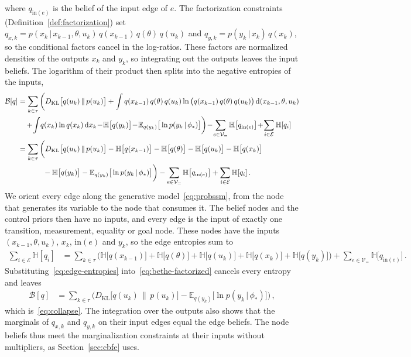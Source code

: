 \documentclass{l4dc2027}
\def\rmd{\mathrm{d}}
\newcommand\given[1][]{\,#1\vert\,}
\newcommand{\E}{\mathbb{E}}
\newcommand{\KL}{D_{\mathrm{KL}}}
\newenvironment{proofof}[1]{\par\noindent{\bfseries\upshape Proof of #1\ }}{\jmlrQED}
\begin{document}
\begin{proofof}{Lemma~\ref{lem:collapse}}
where $q_{\mathrm{in}(e)}$ is the belief of the input edge of $e$. The factorization constraints (Definition~\ref{def:factorization}) set $q_{x,k} = p(x_k \given x_{k-1}, \theta, u_k)\, q(x_{k-1})\, q(\theta)\, q(u_k)$ and $q_{y,k} = p(y_k \given x_k)\, q(x_k)$, so the conditional factors cancel in the log-ratios. These factors are normalized densities of the outputs $x_k$ and $y_k$, so integrating out the outputs leaves the input beliefs. The logarithm of their product then splits into the negative entropies of the inputs,
\begin{align}
	\mathcal{B}[q] &= \sum_{k\in\tau} \bigg( \KL\big[q(u_k) \,\|\, p(u_k)\big]  + \int q(x_{k-1})\, q(\theta)\, q(u_k) \ln\big(q(x_{k-1})\, q(\theta)\, q(u_k)\big)\,\rmd(x_{k-1}, \theta, u_k) \nonumber\\
	&\quad + \! \int \! q(x_k) \ln q(x_k)\,\rmd x_k \! - \! \mathbb{H}\big[q(y_k)\big] \! - \! \E_{q(y_k)}\big[\ln p(y_k \given \phi_*)\big] \bigg)  \! - \! \sum_{e\in\mathcal{V}_=} \mathbb{H}\big[q_{\mathrm{in}(e)}\big] \! + \! \sum_{i\in\mathcal{E}} \mathbb{H}[q_i] \nonumber\\
	&= \sum_{k\in\tau} \bigg( \KL\big[q(u_k) \,\|\, p(u_k)\big] - \mathbb{H}\big[q(x_{k-1})\big] - \mathbb{H}\big[q(\theta)\big] - \mathbb{H}\big[q(u_k)\big] - \mathbb{H}\big[q(x_k)\big] \nonumber\\
	&\hphantom{= \sum_{k\in\tau} \bigg(} - \mathbb{H}\big[q(y_k)\big] - \E_{q(y_k)}\big[\ln p(y_k \given \phi_*)\big] \bigg) - \sum_{e\in\mathcal{V}_=} \mathbb{H}\big[q_{\mathrm{in}(e)}\big] + \sum_{i\in\mathcal{E}} \mathbb{H}[q_i] \, . \label{eq:bethe-factorized}
\end{align}
We orient every edge along the generative model~\eqref{eq:probssm}, from the node that generates its variable to the node that consumes it. The belief nodes and the control priors then have no inputs, and every edge is the input of exactly one transition, measurement, equality or goal node. These nodes have the inputs $(x_{k-1}, \theta, u_k)$, $x_k$, $\mathrm{in}(e)$ and $y_k$, so the edge entropies sum to
\begin{align}
	\sum_{i\in\mathcal{E}} \mathbb{H}[q_i] &= \sum_{k\in\tau} \Big( \mathbb{H}\big[q(x_{k-1})\big] + \mathbb{H}\big[q(\theta)\big] + \mathbb{H}\big[q(u_k)\big] + \mathbb{H}\big[q(x_k)\big] + \mathbb{H}\big[q(y_k)\big] \Big)  + \sum_{e\in\mathcal{V}_=} \mathbb{H}\big[q_{\mathrm{in}(e)}\big] \, . \label{eq:edge-entropies}
\end{align}
Substituting~\eqref{eq:edge-entropies} into~\eqref{eq:bethe-factorized} cancels every entropy and leaves
\begin{align}
	\mathcal{B}[q] &= \sum_{k\in\tau} \Big( \KL\big[q(u_k) \,\|\, p(u_k)\big] - \E_{q(y_k)}\big[\ln p(y_k \given \phi_*)\big] \Big) \, , 
\end{align}
which is~\eqref{eq:collapse}. The integration over the outputs also shows that the marginals of $q_{x,k}$ and $q_{y,k}$ on their input edges equal the edge beliefs. The node beliefs thus meet the marginalization constraints at their inputs without multipliers, as Section~\ref{sec:cbfe} uses. 
\end{proofof}
\end{document}
